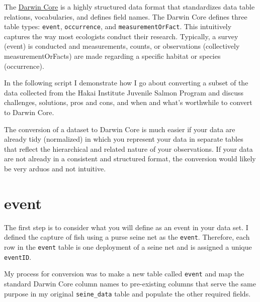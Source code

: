 \documentclass[]{book}
\begin{document}
The \href{https://dwc.tdwg.org}{Darwin Core} is a highly structured data format that standardizes data table relations, vocabularies, and defines field names. The Darwin Core defines three table types: \texttt{event}, \texttt{occurrence}, and \texttt{measurementOrFact}. This intuitively captures the way most ecologists conduct their research. Typically, a survey (event) is conducted and measurements, counts, or observations (collectively measurementOrFacts) are made regarding a specific habitat or species (occurrence).

In the following script I demonstrate how I go about converting a subset of the data collected from the Hakai Institute Juvenile Salmon Program and discuss challenges, solutions, pros and cons, and when and what's worthwhile to convert to Darwin Core.

The conversion of a dataset to Darwin Core is much easier if your data are already tidy (normalized) in which you represent your data in separate tables that reflect the hierarchical and related nature of your observations. If your data are not already in a consistent and structured format, the conversion would likely be very arduos and not intuitive.

\hypertarget{event}{%
\section{event}\label{event}}

The first step is to consider what you will define as an event in your data set. I defined the capture of fish using a purse seine net as the \texttt{event}. Therefore, each row in the \texttt{event} table is one deployment of a seine net and is assigned a unique \texttt{eventID}.

My process for conversion was to make a new table called \texttt{event} and map the standard Darwin Core column names to pre-existing columns that serve the same purpose in my original \texttt{seine\_data} table and populate the other required fields.
\end{document}
